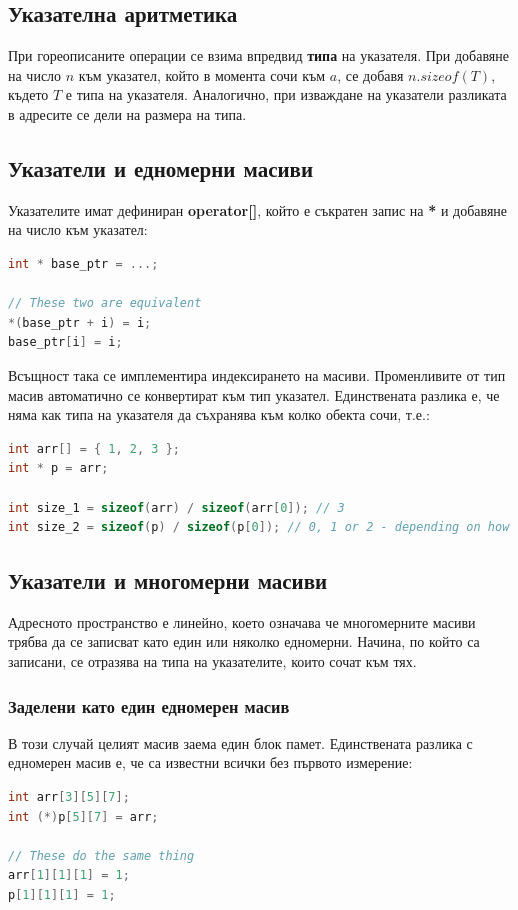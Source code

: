 \documentclass[fleqn,12pt]{article}
\begin{document}
\subsection{Указателна аритметика}
При гореописаните операции се взима впредвид \textbf{типа} на указателя. При добавяне на число $n$ към указател, който в момента сочи към $a$, се 
добавя $n . sizeof(T)$, където $T$ е типа на указателя. Аналогично, при изваждане на указатели разликата в адресите се дели на размера на типа.

\subsection{Указатели и едномерни масиви}

Указателите имат дефиниран \textbf{operator[]}, който е съкратен запис на \textbf{*} и добавяне на число към указател:
\begin{lstlisting}[language=C++, caption=Pointer example 3]
int * base_ptr = ...;

// These two are equivalent
*(base_ptr + i) = i;
base_ptr[i] = i;
\end{lstlisting}

Всъщност така се имплементира индексирането на масиви. Променливите от тип масив автоматично се конвертират към тип указател.
Единствената разлика е, че няма как типа на указателя да съхранява към колко обекта сочи, т.е.:

\begin{lstlisting}[language=C++, caption=Pointer example 3]
int arr[] = { 1, 2, 3 };
int * p = arr;

int size_1 = sizeof(arr) / sizeof(arr[0]); // 3
int size_2 = sizeof(p) / sizeof(p[0]); // 0, 1 or 2 - depending on how big the pointer is wrt to the int type
\end{lstlisting}

\subsection{Указатели и многомерни масиви}
Адресното пространство е линейно, което означава че многомерните масиви трябва да се записват като един или няколко едномерни.
Начина, по който са записани, се отразява на типа на указателите, които сочат към тях.

\subsubsection{Заделени като един едномерен масив}
В този случай целият масив заема един блок памет. Единствената разлика с едномерен масив е, че са известни всички без първото измерение:
\begin{lstlisting}[language=C++, caption=Multidimensional pointers]
int arr[3][5][7];
int (*)p[5][7] = arr;

// These do the same thing
arr[1][1][1] = 1;
p[1][1][1] = 1;
\end{lstlisting}
\end{document}
